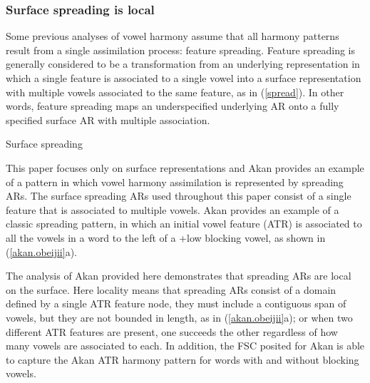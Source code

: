 \documentclass[,doc,floatsintext]{apa6}
\theoremstyle{definition}
\theoremstyle{definition}
\theoremstyle{definition}
\theoremstyle{remark}
\begin{document}
\subsubsection{Surface spreading is
local}\label{surface-spreading-is-local}

Some previous analyses of vowel harmony assume that all harmony patterns
result from a single assimilation process: feature spreading. Feature
spreading is generally considered to be a transformation from an
underlying representation in which a single feature is associated to a
single vowel into a surface representation with multiple vowels
associated to the same feature, as in (\ref{spread}). In other words,
feature spreading maps an underspecified underlying AR onto a fully
specified surface AR with multiple association.

\begin{exe}
\ex Surface spreading \label{spread} \\
\end{exe}

This paper focuses only on surface representations and Akan provides an
example of a pattern in which vowel harmony assimilation is represented
by spreading ARs. The surface spreading ARs used throughout this paper
consist of a single feature that is associated to multiple vowels. Akan
provides an example of a classic spreading pattern, in which an initial
vowel feature (ATR) is associated to all the vowels in a word to the
left of a +low blocking vowel, as shown in (\ref{akan.obeijii}a).

The analysis of Akan provided here demonstrates that spreading ARs are
local on the surface. Here locality means that spreading ARs consist of
a domain defined by a single ATR feature node, they must include a
contiguous span of vowels, but they are not bounded in length, as in
(\ref{akan.obeijii}a); or when two different ATR features are present,
one succeeds the other regardless of how many vowels are associated to
each. In addition, the FSC posited for Akan is able to capture the Akan
ATR harmony pattern for words with and without blocking vowels.
\end{document}
